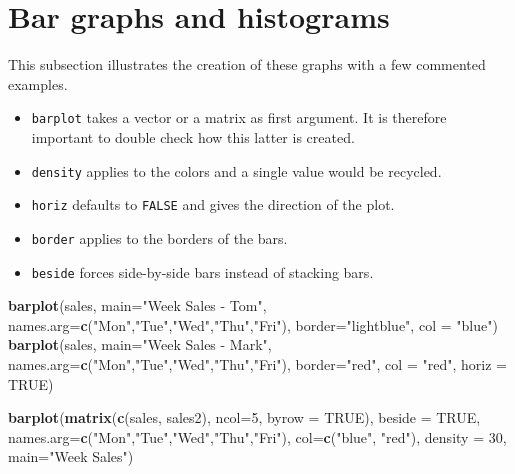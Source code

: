 \documentclass[]{book}
\newenvironment{Shaded}{}{}
\newcommand{\DataTypeTok}[1]{\textcolor[rgb]{0.56,0.13,0.00}{#1}}
\newcommand{\DecValTok}[1]{\textcolor[rgb]{0.25,0.63,0.44}{#1}}
\newcommand{\KeywordTok}[1]{\textcolor[rgb]{0.00,0.44,0.13}{\textbf{#1}}}
\newcommand{\NormalTok}[1]{#1}
\newcommand{\OtherTok}[1]{\textcolor[rgb]{0.00,0.44,0.13}{#1}}
\newcommand{\StringTok}[1]{\textcolor[rgb]{0.25,0.44,0.63}{#1}}
\providecommand{\tightlist}{%
  \setlength{\itemsep}{0pt}\setlength{\parskip}{0pt}}
\theoremstyle{definition}
\theoremstyle{definition}
\theoremstyle{definition}
\theoremstyle{remark}
\begin{document}
\hypertarget{bar-graphs-and-histograms}{%
\section{Bar graphs and histograms}\label{bar-graphs-and-histograms}}

This subsection illustrates the creation of these graphs with a few
commented examples.

\begin{itemize}
\tightlist
\item
  \texttt{barplot} takes a vector or a matrix as first argument. It is
  therefore important to double check how this latter is created.
\item
  \texttt{density} applies to the colors and a single value would be
  recycled.
\item
  \texttt{horiz} defaults to \texttt{FALSE} and gives the direction of
  the plot.
\item
  \texttt{border} applies to the borders of the bars.
\item
  \texttt{beside} forces side-by-side bars instead of stacking bars.
\end{itemize}

\begin{Shaded}
\begin{Highlighting}[]
\KeywordTok{barplot}\NormalTok{(sales,}
        \DataTypeTok{main=}\StringTok{"Week Sales - Tom"}\NormalTok{,}
        \DataTypeTok{names.arg=}\KeywordTok{c}\NormalTok{(}\StringTok{"Mon"}\NormalTok{,}\StringTok{"Tue"}\NormalTok{,}\StringTok{"Wed"}\NormalTok{,}\StringTok{"Thu"}\NormalTok{,}\StringTok{"Fri"}\NormalTok{),}
        \DataTypeTok{border=}\StringTok{"lightblue"}\NormalTok{,}
        \DataTypeTok{col =} \StringTok{"blue"}\NormalTok{)}
\KeywordTok{barplot}\NormalTok{(sales,}
        \DataTypeTok{main=}\StringTok{"Week Sales - Mark"}\NormalTok{,}
        \DataTypeTok{names.arg=}\KeywordTok{c}\NormalTok{(}\StringTok{"Mon"}\NormalTok{,}\StringTok{"Tue"}\NormalTok{,}\StringTok{"Wed"}\NormalTok{,}\StringTok{"Thu"}\NormalTok{,}\StringTok{"Fri"}\NormalTok{),}
        \DataTypeTok{border=}\StringTok{"red"}\NormalTok{,}
        \DataTypeTok{col =} \StringTok{"red"}\NormalTok{,}
        \DataTypeTok{horiz =} \OtherTok{TRUE}\NormalTok{)}

\KeywordTok{barplot}\NormalTok{(}\KeywordTok{matrix}\NormalTok{(}\KeywordTok{c}\NormalTok{(sales, sales2), }\DataTypeTok{ncol=}\DecValTok{5}\NormalTok{, }\DataTypeTok{byrow =} \OtherTok{TRUE}\NormalTok{),}
        \DataTypeTok{beside =} \OtherTok{TRUE}\NormalTok{,}
        \DataTypeTok{names.arg=}\KeywordTok{c}\NormalTok{(}\StringTok{"Mon"}\NormalTok{,}\StringTok{"Tue"}\NormalTok{,}\StringTok{"Wed"}\NormalTok{,}\StringTok{"Thu"}\NormalTok{,}\StringTok{"Fri"}\NormalTok{),}
        \DataTypeTok{col=}\KeywordTok{c}\NormalTok{(}\StringTok{"blue"}\NormalTok{, }\StringTok{"red"}\NormalTok{),}
        \DataTypeTok{density =} \DecValTok{30}\NormalTok{, }
        \DataTypeTok{main=}\StringTok{"Week Sales"}\NormalTok{)}
\end{Highlighting}
\end{Shaded}
\end{document}
